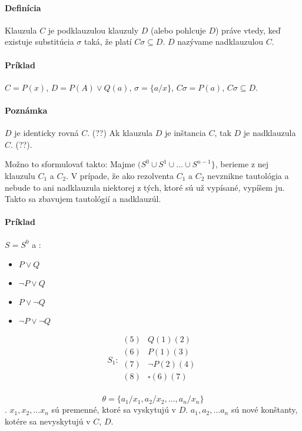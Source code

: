\paragraph{Definícia} Klauzula $C$ je podklauzulou klauzuly $D$ (alebo pohlcuje
$D$) práve vtedy, keď existuje substitúcia $\sigma$ taká, že platí $C\sigma
\subseteq D$. $D$ nazývame nadklauzulou $C$.

\paragraph{Príklad} $C = P(x)$, $D = P(A) \lor Q(a)$, $\sigma = \{a/x\}$,
$C\sigma = P(a)$, $C\sigma \subseteq D$.

\paragraph{Poznámka} $D$ je identicky rovná $C$. (??)
Ak klauzula $D$ je inštancia $C$, tak $D$ je nadklauzula $C$. (??). 

\par
Možno to sformulovať takto: Majme $(S^0 \cup S^1 \cup \ldots \cup
S^{n-1}\}$, berieme z nej klauzulu $C_1$ a $C_2$. V prípade, že ako rezolventa
$C_1$ a $C_2$ nevznikne tautológia a nebude to ani nadklauzula niektorej z tých,
ktoré sú už vypísané, vypíšem ju. Takto sa zbavujem tautológií a nadklauzúl.

\paragraph{Príklad} $S=S^0$ a :
\begin{itemize}
	\item $P\lor Q$
	\item $\neg P \lor Q$
	\item $P\lor \neg Q$
	\item $\neg P \lor \neg Q$
\end{itemize}
$$
S_1:
\begin{array}{ll}
(5)& Q (1) (2)\\
(6)& P (1) (3)\\
(7)& \neg P (2) (4)\\
(8)& \square (6) (7)\\
\end{array}
$$

$$\theta = \{ a_1 / x_1, a_2 / x_2, \ldots, a_n / x_n \}$$. $x_1, x_2, \ldots
x_n$ sú premenné, ktoré sa vyskytujú v $D$. $a_1, a_2, \ldots a_n$ sú nové
konštanty, kotére sa nevyskytujú v $C$, $D$.

